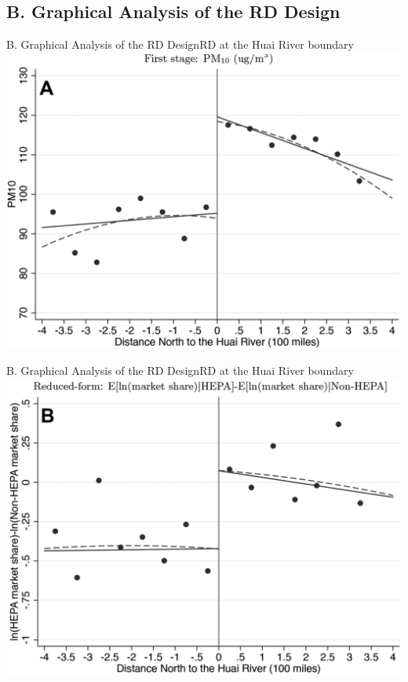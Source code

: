 \documentclass{beamer}
\begin{document}
\subsection{B. Graphical Analysis of the RD Design}
\begin{frame}[shrink]
	\transfade %
	\tableofcontents[sectionstyle=show/shaded,subsectionstyle=show/shaded/hide]
	\addtocounter{framenumber}{-1}
\end{frame}
\begin{frame}{B. Graphical Analysis of the RD Design}{RD at the Huai River boundary}
	\centering
	\includegraphics[scale=0.35]{figure2_1.png}
\end{frame}
\begin{frame}{B. Graphical Analysis of the RD Design}{RD at the Huai River boundary}
	\centering
	\includegraphics[scale=0.35]{figure2_2.png}
\end{frame}
\end{document}
